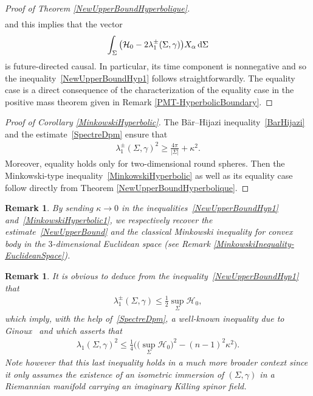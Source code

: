 \documentclass[10pt,a4paper]{amsart}
\numberwithin{equation}{section}
\newtheorem{Remark}[Theorem]{Remark}
\begin{document}
\begin{proof}[Proof of Theorem \ref{NewUpperBoundHyperbolique}]
\begin{gather*}
\end{gather*}
and this implies that the vector
\begin{gather*}
\int_{\Sigma}\big(\mathcal{H}_{0}-2\lambda_1^\pm(\Sigma,\gamma)\big)X_\alpha\,{\rm d}\Sigma
\end{gather*}
is future-directed causal. In particular, its time component is nonnegative and so the inequality~\eqref{NewUpperBoundHyp1} follows straightforwardly. The equality case is a direct consequence of the characterization of the equality case in the positive mass theorem given in Remark \ref{PMT-HyperbolicBoundary}.
\end{proof}


\begin{proof}[Proof of Corollary \ref{MinkowskiHyperbolic}]
The B\"ar--Hijazi inequality~\eqref{BarHijazi} and the estimate~\eqref{SpectreDpm} ensure that
\begin{gather*}
\lambda^\pm_1(\Sigma,\gamma)^2\geq\frac{4\pi}{|\Sigma|}+\kappa^2.
\end{gather*}
Moreover, equality holds only for two-dimensional round spheres. Then the Minkowski-type inequality~\eqref{MinkowskiHyperbolic} as well as its equality case follow directly from Theorem \ref{NewUpperBoundHyperbolique}.
\end{proof}

\begin{Remark}
By sending $\kappa\rightarrow 0$ in the inequalities~\eqref{NewUpperBoundHyp1} and~\eqref{MinkowskiHyperbolic1}, we respectively recover the estimate~\eqref{NewUpperBound} and the classical Minkowski inequality for convex body in the $3$-dimensional Euclidean space (see Remark \ref{MinkowskiInequality-EuclideanSpace}).
\end{Remark}

\begin{Remark}
It is obvious to deduce from the inequality~\eqref{NewUpperBoundHyp1} that
\begin{gather*}
\lambda_1^\pm(\Sigma,\gamma)\leq\frac{1}{2}\sup_\Sigma\mathcal{H}_0,
\end{gather*}
which imply, with the help of~\eqref{SpectreDpm}, a well-known inequality due to Ginoux~\cite{Ginoux2} and which asserts that
\begin{gather*}
\lambda_1(\Sigma,\gamma)^2\leq\frac{1}{4}\big(\big(\sup_\Sigma\mathcal{H}_0\big)^2-(n-1)^2\kappa^2\big).
\end{gather*}
Note however that this last inequality holds in a much more broader context since it only assumes the existence of an isometric immersion of $(\Sigma,\gamma)$ in a Riemannian manifold carrying an imaginary Killing spinor field.
\end{Remark}
\end{document}
